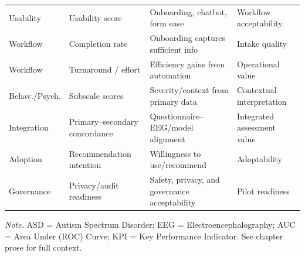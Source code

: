 {\begin{xltabular}{\textwidth}{@{} L L L L @{}}
\addlinespace
Usability & Usability score & Onboarding, chatbot, form ease & Workflow acceptability \\
\addlinespace
Workflow & Completion rate & Onboarding captures sufficient info & Intake quality \\
\addlinespace
Workflow & Turnaround / effort & Efficiency gains from automation & Operational value \\
\addlinespace
Behav./Psych. & Subscale scores & Severity/context from primary data & Contextual interpretation \\
\addlinespace
Integration & Primary--secondary concordance & Questionnaire--EEG/model alignment & Integrated assessment value \\
\addlinespace
Adoption & Recommendation intention & Willingness to use/recommend & Adoptability \\
\addlinespace
Governance & Privacy/audit readiness & Safety, privacy, and governance acceptability & Pilot readiness \\
\end{xltabular}}
\vspace{0.3em}\noindent\textit{Note.} ASD = Autism Spectrum Disorder; EEG = Electroencephalography; AUC = Area Under (ROC) Curve; KPI = Key Performance Indicator. See chapter prose for full context.

